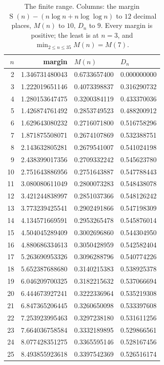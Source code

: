 \documentclass[11pt]{amsart}
\DeclareMathOperator{\Sfun}{S}
\begin{document}
\begin{table}[htbp]
\caption{The finite range. Columns: the margin
$\Sfun(n)-(n\log n+n\log\log n)$ to $12$ decimal places, $M(n)$ to $10$, $D_n$ to $9$.
Every margin is positive; the least is at $n=3$, and $\min_{2\le n\le35}M(n)=M(7)$.}
\label{tab:cell}
\medskip
\begin{tabular}{r@{\qquad}r@{\qquad}l@{\qquad}l}
\hline
$n$ & margin & $M(n)$ & $D_n$\\
\hline
 2 &  1.346731480043 & 0.6733657400 & 0.000000000\\
 3 &  1.222019651146 & 0.4073398837 & 0.316290732\\
 4 &  1.280153647475 & 0.3200384119 & 0.433370036\\
 5 &  1.426874761492 & 0.2853749523 & 0.488200912\\
 6 &  1.629643080232 & 0.2716071800 & 0.516758296\\
 7 &  1.871875508071 & 0.2674107869 & 0.532388751\\
 8 &  2.143632805281 & 0.2679541007 & 0.541024198\\
 9 &  2.438399017356 & 0.2709332242 & 0.545623780\\
10 &  2.751643886956 & 0.2751643887 & 0.547788443\\
11 &  3.080080611049 & 0.2800073283 & 0.548438078\\
12 &  3.421244838997 & 0.2851037366 & 0.548126242\\
13 &  3.773239425541 & 0.2902491866 & 0.547198309\\
14 &  4.134571669591 & 0.2953265478 & 0.545876014\\
15 &  4.504045289409 & 0.3002696860 & 0.544304950\\
16 &  4.880686334613 & 0.3050428959 & 0.542582404\\
17 &  5.263690953326 & 0.3096288796 & 0.540774226\\
18 &  5.652387688680 & 0.3140215383 & 0.538925378\\
19 &  6.046209700325 & 0.3182215632 & 0.537066694\\
20 &  6.444673927241 & 0.3222336964 & 0.535219308\\
21 &  6.847365206445 & 0.3260650098 & 0.533397608\\
22 &  7.253923995463 & 0.3297238180 & 0.531611256\\
23 &  7.664036758584 & 0.3332189895 & 0.529866561\\
24 &  8.077428351275 & 0.3365595146 & 0.528167456\\
25 &  8.493855923618 & 0.3397542369 & 0.526516174\\

\end{tabular}
\end{table}
\end{document}
